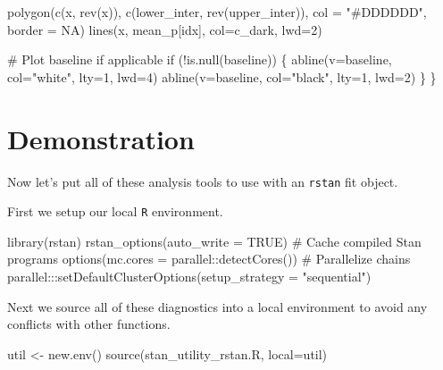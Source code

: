 \documentclass[
  letterpaper,
  DIV=11,
  numbers=noendperiod]{scrartcl}
\newenvironment{Shaded}{\begin{snugshade}}{\end{snugshade}}
\newcommand{\AttributeTok}[1]{\textcolor[rgb]{0.40,0.45,0.13}{#1}}
\newcommand{\CommentTok}[1]{\textcolor[rgb]{0.37,0.37,0.37}{#1}}
\newcommand{\ConstantTok}[1]{\textcolor[rgb]{0.56,0.35,0.01}{#1}}
\newcommand{\ControlFlowTok}[1]{\textcolor[rgb]{0.00,0.23,0.31}{#1}}
\newcommand{\DecValTok}[1]{\textcolor[rgb]{0.68,0.00,0.00}{#1}}
\newcommand{\FunctionTok}[1]{\textcolor[rgb]{0.28,0.35,0.67}{#1}}
\newcommand{\KeywordTok}[1]{\textcolor[rgb]{0.00,0.23,0.31}{#1}}
\newcommand{\NormalTok}[1]{\textcolor[rgb]{0.00,0.23,0.31}{#1}}
\newcommand{\OperatorTok}[1]{\textcolor[rgb]{0.37,0.37,0.37}{#1}}
\newcommand{\OtherTok}[1]{\textcolor[rgb]{0.00,0.23,0.31}{#1}}
\newcommand{\SpecialCharTok}[1]{\textcolor[rgb]{0.37,0.37,0.37}{#1}}
\newcommand{\StringTok}[1]{\textcolor[rgb]{0.13,0.47,0.30}{#1}}
\begin{document}
\begin{Shaded}
\begin{Highlighting}[]
\NormalTok{  polygon(c(x, rev(x)), c(lower\_inter, rev(upper\_inter)),}
\NormalTok{          col }\OperatorTok{=} \StringTok{"\#DDDDDD"}\NormalTok{, border }\OperatorTok{=}\NormalTok{ NA)}
\NormalTok{  lines(x, mean\_p[idx], col}\OperatorTok{=}\NormalTok{c\_dark, lwd}\OperatorTok{=}\DecValTok{2}\NormalTok{)}
  
  \CommentTok{\# Plot baseline if applicable}
  \ControlFlowTok{if}\NormalTok{ (}\OperatorTok{!}\KeywordTok{is}\NormalTok{.null(baseline)) \{}
\NormalTok{    abline(v}\OperatorTok{=}\NormalTok{baseline, col}\OperatorTok{=}\StringTok{"white"}\NormalTok{, lty}\OperatorTok{=}\DecValTok{1}\NormalTok{, lwd}\OperatorTok{=}\DecValTok{4}\NormalTok{)}
\NormalTok{    abline(v}\OperatorTok{=}\NormalTok{baseline, col}\OperatorTok{=}\StringTok{"black"}\NormalTok{, lty}\OperatorTok{=}\DecValTok{1}\NormalTok{, lwd}\OperatorTok{=}\DecValTok{2}\NormalTok{)}
\NormalTok{  \}}
\NormalTok{\}}
\end{Highlighting}
\end{Shaded}

\section{Demonstration}\label{demonstration}

Now let's put all of these analysis tools to use with an \texttt{rstan}
fit object.

First we setup our local \texttt{R} environment.

\begin{Shaded}
\begin{Highlighting}[]
\FunctionTok{library}\NormalTok{(rstan)}
\FunctionTok{rstan\_options}\NormalTok{(}\AttributeTok{auto\_write =} \ConstantTok{TRUE}\NormalTok{)            }\CommentTok{\# Cache compiled Stan programs}
\FunctionTok{options}\NormalTok{(}\AttributeTok{mc.cores =}\NormalTok{ parallel}\SpecialCharTok{::}\FunctionTok{detectCores}\NormalTok{()) }\CommentTok{\# Parallelize chains}
\NormalTok{parallel}\SpecialCharTok{:::}\FunctionTok{setDefaultClusterOptions}\NormalTok{(}\AttributeTok{setup\_strategy =} \StringTok{"sequential"}\NormalTok{)}
\end{Highlighting}
\end{Shaded}

Next we source all of these diagnostics into a local environment to
avoid any conflicts with other functions.

\begin{Shaded}
\begin{Highlighting}[]
\NormalTok{util }\OtherTok{\textless{}{-}} \FunctionTok{new.env}\NormalTok{()}
\FunctionTok{source}\NormalTok{(}\StringTok{\textquotesingle{}stan\_utility\_rstan.R\textquotesingle{}}\NormalTok{, }\AttributeTok{local=}\NormalTok{util)}
\end{Highlighting}
\end{Shaded}
\end{document}
